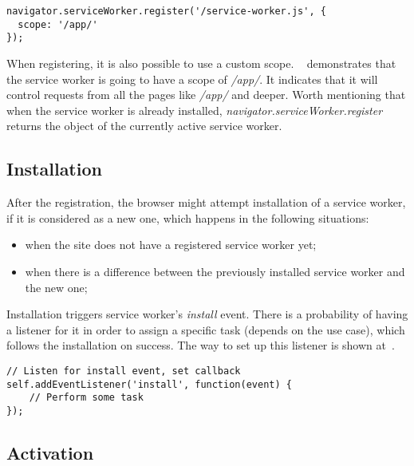 \begin{lstlisting}[caption={An example code, which demonstrates how to set a custom scope when registering a service worker\cite{32}.}, label={lst:tech2}]
navigator.serviceWorker.register('/service-worker.js', {
  scope: '/app/'
});
\end{lstlisting}

When registering, it is also possible to use a custom scope. ~ demonstrates that the service worker is going to have a scope of \textit{/app/}. It indicates that it will control requests from all the pages like \textit{/app/} and deeper. Worth mentioning that when the service worker is already installed, \textit{navigator.serviceWorker.register} returns the object of the currently active service worker.

\subsection*{Installation}

After the registration, the browser might attempt installation of a service worker, if it is considered as a new one, which happens in the following situations: 

\begin{itemize}
\item{when the site does not have a registered service worker yet;}
\item{when there is a difference between the previously installed service worker and the new one;}
\end{itemize}

Installation triggers service worker's \textit{install} event. There is a probability of having a listener for it in order to assign a specific task (depends on the use case), which follows the installation on success. The way to set up this listener is shown at~.

\begin{lstlisting}[caption={An example code, which demonstates a listener for the \textit{install} service worker's event\cite{32}.}, label={lst:tech3}]
// Listen for install event, set callback
self.addEventListener('install', function(event) {
    // Perform some task
});
\end{lstlisting}

\subsection*{Activation}

